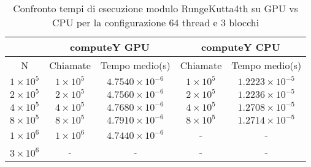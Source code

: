 \begin{table}[ht!]
    \begin{center}
        \renewcommand{\arraystretch}{1.5}
        \begin{adjustbox}{width=.65\textwidth}
            \begin{tabular}{ |c|c|c|c|c| }
                \hline
                \multicolumn{1}{|c}{} & \multicolumn{2}{|c}{computeY GPU} & \multicolumn{2}{|c|}{computeY CPU} \\
                \hline
                 N & Chiamate & Tempo medio(s) & Chiamate & Tempo medio(s) \\
                \hline 
                $1 \times 10^5$ & $1 \times 10^{5}$ & $4.7540 \times 10^{-6}$ & $1 \times 10^{5}$ & $1.2223 \times 10^{-5}$ \\ 
                \hline 
                $2 \times 10^5$ & $2 \times 10^{5}$ & $4.7560 \times 10^{-6}$ & $2 \times 10^{5}$ & $1.2236 \times 10^{-5}$ \\ 
                \hline 
                $4 \times 10^5$ & $4 \times 10^{5}$ & $4.7680 \times 10^{-6}$ & $4 \times 10^{5}$ & $1.2708 \times 10^{-5}$ \\ 
                \hline
                $8 \times 10^5$ & $8 \times 10^{5}$ & $4.7910 \times 10^{-6}$ & $8 \times 10^{5}$ & $1.2714 \times 10^{-5}$ \\ 
                \hline 
                $1 \times 10^6$ & $1 \times 10^{6}$ & $4.7440 \times 10^{-6}$ & - & - \\ 
                \hline 
                $3 \times 10^6$ & - & - & - & - \\ 
                \hline 
            \end{tabular}
        \end{adjustbox}
    \end{center}
    \caption{Confronto tempi di esecuzione modulo RungeKutta4th su GPU vs CPU per la configurazione 64 thread e 3 blocchi}
    \label{tab:computeY_kernel_table_64x3}
\end{table}

